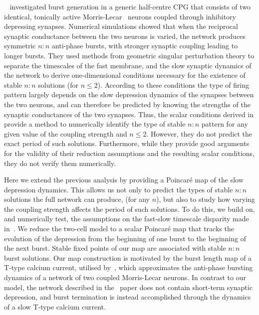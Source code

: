 \documentclass[utf8]{frontiersFPHY} %
\begin{document}
~\citet{bose2011} investigated burst generation in a generic half-centre CPG that consists
of two identical, tonically active Morris-Lecar~\citep{morris1981} neurons coupled through
inhibitory depressing synapses.
Numerical simulations showed that when the reciprocal synaptic conductance between the two neurons is varied, the network produces symmetric $n:n$ anti-phase bursts, with stronger synaptic coupling leading to longer bursts.
They used methods from geometric singular perturbation theory to separate the timescales of the fast membrane, and the slow synaptic dynamics of the network to derive one-dimensional conditions necessary for the existence of stable $n:n$ solutions (for $n\leq 2$).
According to these conditions the type of firing pattern largely depends on the slow
depression dynamics of the synapses between the two neurons, and can therefore be
predicted by knowing the strengths of the synaptic conductances of the two synapses.
Thus, the scalar conditions derived in \citet{bose2011} provide a method to numerically
identify the type of stable $n:n$ pattern for any given value of the coupling strength and $n\leq 2$.
However, they do not predict the exact period of such solutions.
Furthermore, while they provide good arguments for the validity of their reduction assumptions and the resulting scalar conditions, they do not verify them numerically.

Here we extend the previous analysis by providing a Poincaré map of the slow depression
dynamics.
This allows us not only to predict the types of stable $n:n$ solutions the full
network can produce, (for any $n$), but also to study how varying the coupling strength
affects the period of such solutions.
To do this, we build on, and numerically test, the
assumptions on the fast-slow timescale disparity made in~\cite{bose2011}.
We reduce the two-cell model to a scalar Poincaré map that tracks the evolution of the depression from the beginning of one burst to the beginning of the next burst.
Stable fixed points of our map are associated with stable $n:n$ burst solutions.
Our map construction is motivated by the burst length map of a T-type calcium current, utilised by~\citet{matveev2007}, which approximates the anti-phase bursting dynamics of a network of two coupled Morris-Lecar neurons.
In contrast to our model, the network described in the~\cite{matveev2007} paper does not contain short-term synaptic depression, and burst termination is instead accomplished through the dynamics of a slow T-type calcium current.
\end{document}
